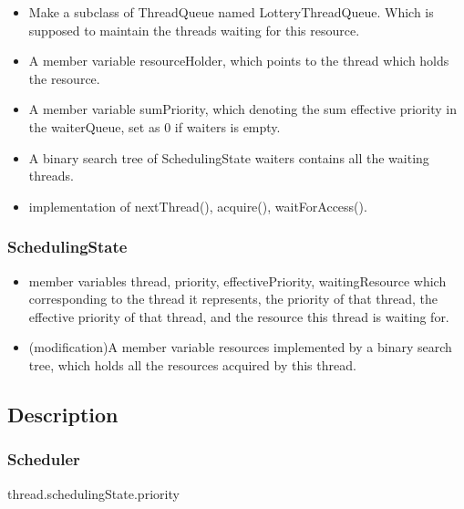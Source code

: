 \documentclass{article}
\begin{document}
	\begin{itemize}
		\item Make a subclass of ThreadQueue named LotteryThreadQueue. Which is supposed to maintain the threads waiting for this resource.
		
		\item A member variable resourceHolder, which points to the thread which holds the resource.
		
		\item A member variable sumPriority, which denoting the sum effective priority in the waiterQueue, set as 0 if waiters is empty.
		
		\item A binary search tree of SchedulingState waiters contains all the waiting threads.
		
		\item implementation of nextThread(), acquire(), waitForAccess().
	\end{itemize}
	
	\subsubsection{SchedulingState}
	
	\begin{itemize}
		\item member variables thread, priority, effectivePriority, waitingResource which corresponding to the thread it represents, the priority of that thread, the effective priority of that thread, and the resource this thread is waiting for.
		
		\item (modification)A member variable resources implemented by a binary search tree, which holds all the resources acquired by this thread.
	\end{itemize}
	\subsection{Description}
	
	\subsubsection{Scheduler}
	\begin{algorithm}[H]
		\begin{algorithmic}
			\State \Return thread.schedulingState.priority
			\EndProcedure
		\end{algorithmic}
	\end{algorithm}
	
\end{document}
